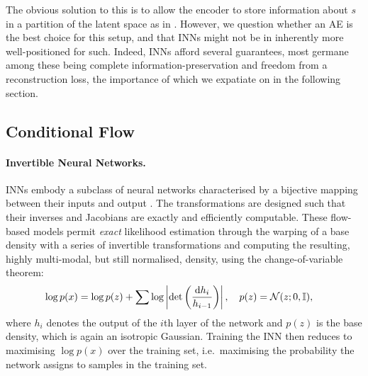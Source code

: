 The obvious solution to this is to allow the encoder to store information about $s$ in a partition
of the latent space as in  \citet{creager2019flexibly}. 
%
However, we question whether an \ac{AE} is the best choice for this setup, and that \acp{INN} might
not be in inherently more well-positioned for such.
%
Indeed, \acp{INN} afford several guarantees, most germane among these being complete
information-preservation and freedom from a reconstruction loss, the importance of which we
expatiate on in the following section.

\subsection{Conditional Flow}\label{cflow}
%
\paragraph{Invertible Neural Networks.}
%
\Acp{INN} embody a subclass of neural networks characterised by a bijective mapping between their
inputs and output \citep{Dinh2014}. 
%
The transformations are designed such that their inverses and Jacobians are exactly and efficiently
computable.
%
These flow-based models permit \emph{exact} likelihood estimation \citep{normflows2015} through the
warping of a base density with a series of invertible transformations and computing the resulting,
highly multi-modal, but still normalised, density, using the change-of-variable theorem:
%
\begin{align}
\begin{split}
  \log p(x) &= \log p(z) + 
   \sum \log \left| \det\left( \frac{\diff h_i}{ h_{i-1}}\right) \right|, %
  \quad p(z) = \gN(z; 0, \sI),
  \label{eq:changeofvariables}
\end{split}
\end{align}
%
where $h_i$ denotes the output of the \(i\)th layer of the network and $p(z)$ is the base density,
which is again an isotropic Gaussian. 
%
Training the \ac{INN} then reduces to maximising $\log p(x)$ over the training set, i.e.\ maximising the
probability the network assigns to samples in the training set.
%

